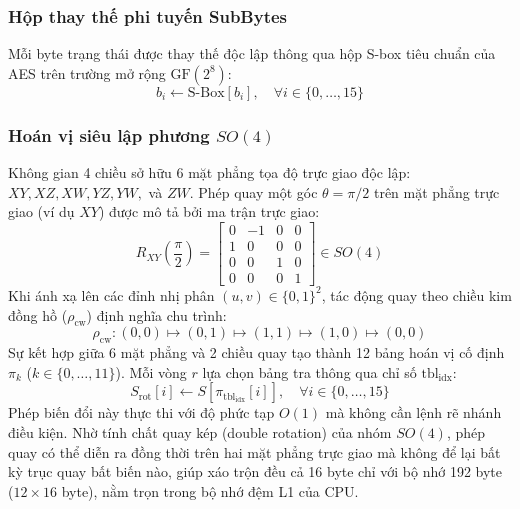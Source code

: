 \documentclass[10pt,twocolumn]{article}
\begin{document}
\subsubsection{Hộp thay thế phi tuyến SubBytes}
Mỗi byte trạng thái được thay thế độc lập thông qua hộp S-box tiêu chuẩn của AES trên trường mở rộng $\text{GF}(2^8)$:
\begin{equation}
    b_i \leftarrow \text{S-Box}[b_i], \quad \forall i \in \{0, \dots, 15\}
\end{equation}

\subsubsection{Hoán vị siêu lập phương $SO(4)$}
Không gian 4 chiều sở hữu 6 mặt phẳng tọa độ trực giao độc lập: $XY, XZ, XW, YZ, YW,$ và $ZW$. Phép quay một góc $\theta = \pi/2$ trên mặt phẳng trực giao (ví dụ $XY$) được mô tả bởi ma trận trực giao:
\begin{equation}
    R_{XY}\left(\frac{\pi}{2}\right) = \begin{bmatrix}
        0 & -1 & 0 & 0 \\
        1 & 0 & 0 & 0 \\
        0 & 0 & 1 & 0 \\
        0 & 0 & 0 & 1
    \end{bmatrix} \in SO(4)
\end{equation}
Khi ánh xạ lên các đỉnh nhị phân $(u, v) \in \{0, 1\}^2$, tác động quay theo chiều kim đồng hồ ($\rho_{\text{cw}}$) định nghĩa chu trình:
\begin{equation}
    \rho_{\text{cw}}: (0,0) \mapsto (0,1) \mapsto (1,1) \mapsto (1,0) \mapsto (0,0)
\end{equation}
Sự kết hợp giữa 6 mặt phẳng và 2 chiều quay tạo thành 12 bảng hoán vị cố định $\pi_k$ ($k \in \{0, \dots, 11\}$). Mỗi vòng $r$ lựa chọn bảng tra thông qua chỉ số $\text{tbl}_{\text{idx}}$:
\begin{equation}
    S_{\text{rot}}[i] \leftarrow S[\pi_{\text{tbl}_{\text{idx}}}[i]], \quad \forall i \in \{0, \dots, 15\}
\end{equation}
Phép biến đổi này thực thi với độ phức tạp $O(1)$ mà không cần lệnh rẽ nhánh điều kiện. Nhờ tính chất quay kép (double rotation) của nhóm $SO(4)$, phép quay có thể diễn ra đồng thời trên hai mặt phẳng trực giao mà không để lại bất kỳ trục quay bất biến nào, giúp xáo trộn đều cả 16 byte chỉ với bộ nhớ 192 byte ($12 \times 16$ byte), nằm trọn trong bộ nhớ đệm L1 của CPU.
\end{document}
